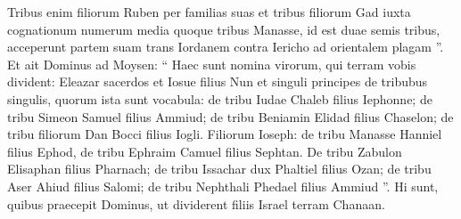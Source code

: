 \begin{biblechapter}
\begin{biblechapter}
\begin{biblechapter}
\begin{biblechapter}
\begin{biblechapter}
\begin{biblechapter}
\begin{biblechapter}
\begin{biblechapter}
\begin{biblechapter}
\begin{biblechapter}
\begin{biblechapter}
\begin{biblechapter}
\begin{biblechapter}
\begin{biblechapter}
\begin{biblechapter}
\begin{biblechapter}
\begin{biblechapter}
\begin{biblechapter}
\begin{biblechapter}
\begin{biblechapter}
\begin{biblechapter}
\begin{biblechapter}
\begin{biblechapter}
\begin{biblechapter}
\begin{biblechapter}
\begin{biblechapter}
\begin{biblechapter}
\begin{biblechapter}
\begin{biblechapter}
\begin{biblechapter}
\begin{biblechapter}
\begin{biblechapter}
\begin{biblechapter}
\begin{biblechapter}
\verse Tribus enim filiorum Ruben per familias suas et tribus filiorum Gad iuxta cognationum numerum media quoque tribus Manasse, 
\verse id est duae semis tribus, acceperunt partem suam trans Iordanem contra Iericho ad orientalem plagam ”.
 \verse Et ait Dominus ad Moysen: 
\verse “ Haec sunt nomina virorum, qui terram vobis divident: Eleazar sacerdos et Iosue filius Nun 
\verse et singuli principes de tribubus singulis, 
\verse quorum ista sunt vocabula: de tribu Iudae Chaleb filius Iephonne; 
\verse de tribu Simeon Samuel filius Ammiud; 
\verse de tribu Beniamin Elidad filius Chaselon; 
\verse de tribu filiorum Dan Bocci filius Iogli. 
\verse Filiorum Ioseph: de tribu Manasse Hanniel filius Ephod, 
\verse de tribu Ephraim Camuel filius Sephtan. 
\verse De tribu Zabulon Elisaphan filius Pharnach; 
\verse de tribu Issachar dux Phaltiel filius Ozan; 
\verse de tribu Aser Ahiud filius Salomi; 
\verse de tribu Nephthali Phedael filius Ammiud ”.
 \verse Hi sunt, quibus praecepit Dominus, ut dividerent filiis Israel terram Chanaan.
 

\end{biblechapter}
\end{biblechapter}
\end{biblechapter}
\end{biblechapter}
\end{biblechapter}
\end{biblechapter}
\end{biblechapter}
\end{biblechapter}
\end{biblechapter}
\end{biblechapter}
\end{biblechapter}
\end{biblechapter}
\end{biblechapter}
\end{biblechapter}
\end{biblechapter}
\end{biblechapter}
\end{biblechapter}
\end{biblechapter}
\end{biblechapter}
\end{biblechapter}
\end{biblechapter}
\end{biblechapter}
\end{biblechapter}
\end{biblechapter}
\end{biblechapter}
\end{biblechapter}
\end{biblechapter}
\end{biblechapter}
\end{biblechapter}
\end{biblechapter}
\end{biblechapter}
\end{biblechapter}
\end{biblechapter}
\end{biblechapter}
